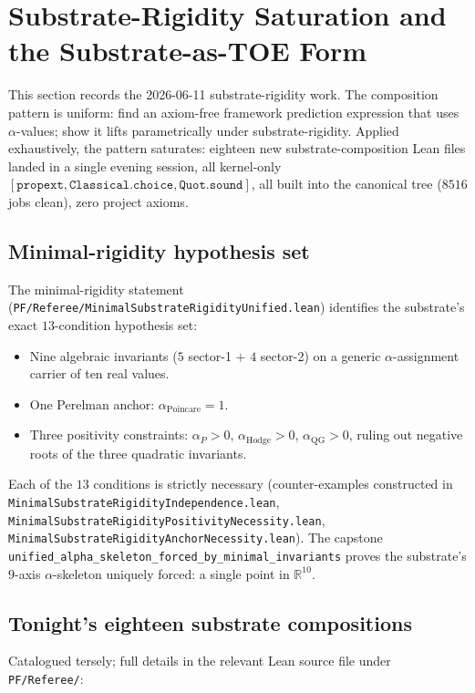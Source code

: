 \documentclass[11pt,a4paper]{article}
\theoremstyle{plain}
\theoremstyle{definition}
\theoremstyle{remark}
\newcommand{\aPo}{\alpha_{\mathrm{Poincare}}}
\newcommand{\aP}{\alpha_{P}}
\newcommand{\aHodge}{\alpha_{\mathrm{Hodge}}}
\newcommand{\aQG}{\alpha_{\mathrm{QG}}}
\newcommand{\code}[1]{\texttt{#1}}
\begin{document}
\section{Substrate-Rigidity Saturation and the Substrate-as-TOE Form}
\label{sec:substrate-rigidity-saturation}

This section records the 2026-06-11 substrate-rigidity work.
The composition pattern is uniform: find an axiom-free framework
prediction expression that uses $\alpha$-values; show it lifts
parametrically under substrate-rigidity. Applied exhaustively,
the pattern saturates: eighteen new substrate-composition Lean
files landed in a single evening session, all kernel-only
$[\code{propext}, \code{Classical.choice}, \code{Quot.sound}]$,
all built into the canonical tree ($8516$ jobs clean), zero
project axioms.

\subsection*{Minimal-rigidity hypothesis set}

The minimal-rigidity statement
(\code{PF/Referee/MinimalSubstrateRigidityUnified.lean})
identifies the substrate's exact $13$-condition hypothesis
set:
\begin{itemize}
\item Nine algebraic invariants ($5$ sector-1 $+$ $4$ sector-2)
on a generic $\alpha$-assignment carrier of ten real values.
\item One Perelman anchor: $\aPo = 1$.
\item Three positivity constraints: $\aP > 0$, $\aHodge > 0$,
$\aQG > 0$, ruling out negative roots of the three quadratic
invariants.
\end{itemize}
Each of the $13$ conditions is strictly necessary (counter-examples
constructed in
\code{MinimalSubstrateRigidityIndependence.lean},
\code{MinimalSubstrateRigidityPositivityNecessity.lean},
\code{MinimalSubstrateRigidityAnchorNecessity.lean}).
The capstone
\code{unified\_alpha\_skeleton\_forced\_by\_minimal\_invariants}
proves the substrate's $9$-axis $\alpha$-skeleton uniquely
forced: a single point in $\mathbb{R}^{10}$.

\subsection*{Tonight's eighteen substrate compositions}

Catalogued tersely; full details in the relevant Lean source
file under \code{PF/Referee/}:
\end{document}
